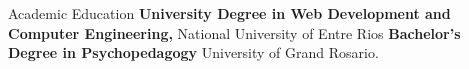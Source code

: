 \begin{rubric}{Academic Education}
\entry*[2023 -- 2025]%
	\textbf{University Degree in Web Development and Computer Engineering, } National University of Entre Rios
%
\entry*[2017 -- 2022]%
	\textbf{Bachelor's Degree in Psychopedagogy} University of Grand Rosario.
\end{rubric}